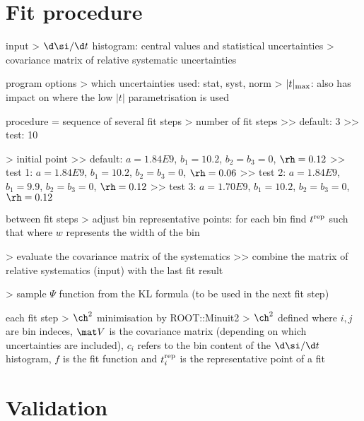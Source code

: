 \chapter[fit]{Fit procedure}

\> input
\>> $\d\si/\d t$ histogram: central values and statistical uncertainties
\>> covariance matrix of relative systematic uncertainties

\> program options
\>> which uncertainties used: stat, syst, norm
\>> $|t|_{\rm max}$: also has impact on where the low $|t|$ parametrisation is used

\> procedure = sequence of several fit steps
\>> number of fit steps
\>>> default: 3
\>>> test: 10

\>> initial point
\>>> default: $a = 1.84E9$, $b_1 = 10.2$, $b_2 = b_3 = 0$, $\rh = 0.12$
\>>> test 1: $a = 1.84E9$, $b_1 = 10.2$, $b_2 = b_3 = 0$, $\rh = 0.06$
\>>> test 2: $a = 1.84E9$, $b_1 = 9.9$, $b_2 = b_3 = 0$, $\rh = 0.12$
\>>> test 3: $a = 1.70E9$, $b_1 = 10.2$, $b_2 = b_3 = 0$, $\rh = 0.12$

\> between fit steps
\>> adjust bin representative points: for each bin find $t^{\rm rep}$ such that
where $w$ represents the width of the bin

\>> evaluate the covariance matrix of the systematics
\>>> combine the matrix of relative systematics (input) with the last fit result

\>> sample $\Psi$ function from the KL formula (to be used in the next fit step)

\> each fit step
\>> $\ch^2$ minimisation by ROOT::Minuit2
\>> $\ch^2$ defined
where $i,j$ are bin indeces, $\mat V$ is the covariance matrix (depending on which uncertainties are included), $c_i$ refers to the bin content of the $\d\si/\d t$ histogram, $f$ is the fit function and $t^{\rm rep}_i$ is the representative point of a fit

%


\chapter{Validation}

